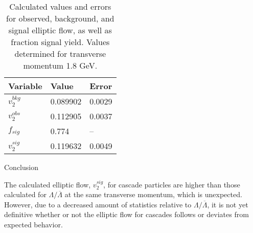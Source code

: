 \documentclass[final]{beamer}
\newlength{\onecolwid}
\begin{document}
\begin{frame}[t]
\begin{columns}[t]
\begin{column}{\onecolwid}
\begin{table}
\vspace{2ex}
\begin{tabularx}{0.8\textwidth}{XXX}
\toprule
\rowcolor{fu-blue!40}\textbf{Variable} & \textbf{Value} & \textbf{Error}\\
\midrule
\rowcolor{fu-blue!10}$ v_{2}^{bkg} $ & 0.089902 & 0.0029 \\
$ v_{2}^{obs} $ & 0.112905 & 0.0037 \\
\rowcolor{fu-blue!10}$ f_{sig} $ & 0.774 & \hspace{2ex}-- \\
\rowcolor{tblyellow}$ v_{2}^{sig} $ & 0.119632 & 0.0049 \\
\bottomrule
\end{tabularx}
\caption{Calculated values and errors for observed, background, and signal
elliptic flow, as well as fraction signal yield. Values determined for
transverse momentum 1.8 GeV.}
\end{table}
\vspace{-0.25in}



\begin{alertblock}{Conclusion}

The calculated elliptic flow, $ v_{2}^{sig} $, for cascade particles are higher
than those calculated for $ \Lambda/\overline{\Lambda} $ at the same transverse
momentum, which is unexpected. However, due to a decreased amount of statistics
relative to $ \Lambda/\overline{\Lambda} $, it is not yet definitive whether or
not the elliptic flow for cascades follows or deviates from expected behavior.

\end{alertblock}
\vspace{-0.25in}



\end{column}
\end{columns}
\end{frame}
\end{document}
